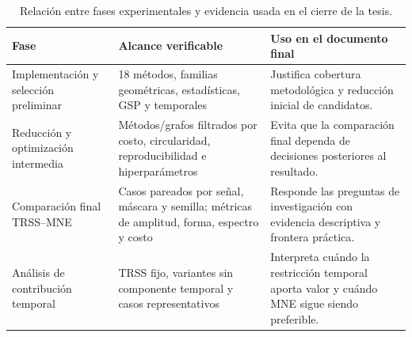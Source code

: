\begin{table}[htbp]
\centering
\small
\caption{Relación entre fases experimentales y evidencia usada en el cierre de la tesis.}
\label{tab:ch6_phase_map}
\begin{tabular}{@{}p{2.9cm}p{4.2cm}p{4.3cm}@{}}
\toprule
Fase & Alcance verificable & Uso en el documento final \\
\midrule
Implementación y selección preliminar & 18 métodos, familias geométricas, estadísticas, GSP y temporales & Justifica cobertura metodológica y reducción inicial de candidatos. \\
Reducción y optimización intermedia & Métodos/grafos filtrados por costo, circularidad, reproducibilidad e hiperparámetros & Evita que la comparación final dependa de decisiones posteriores al resultado. \\
Comparación final TRSS--MNE & Casos pareados por señal, máscara y semilla; métricas de amplitud, forma, espectro y costo & Responde las preguntas de investigación con evidencia descriptiva y frontera práctica. \\
Análisis de contribución temporal & TRSS fijo, variantes sin componente temporal y casos representativos & Interpreta cuándo la restricción temporal aporta valor y cuándo MNE sigue siendo preferible. \\
\bottomrule
\end{tabular}
\end{table}
